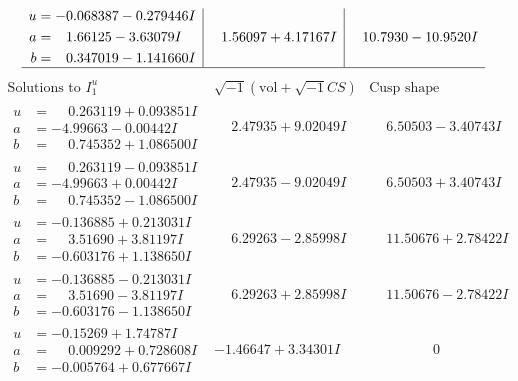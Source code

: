 \documentclass[1p]{elsarticle_modified}
\theoremstyle{definition}
\newcommand{\I}{\sqrt{-1}}
\begin{document}
$$\begin{array}{c|c|c}
\begin{aligned}
u &= -0.068387 - 0.279446 I \\
a &= \phantom{-}1.66125 - 3.63079 I \\
b &= \phantom{-}0.347019 - 1.141660 I\end{aligned}
 & \phantom{-}1.56097 + 4.17167 I & \phantom{-}10.7930 - 10.9520 I\\
 \hline 
 \end{array}$$\newpage$$\begin{array}{c|c|c}  
\text{Solutions to }I^u_{1}& \I (\text{vol} + \sqrt{-1}CS) & \text{Cusp shape}\\
 \hline 
\begin{aligned}
u &= \phantom{-}0.263119 + 0.093851 I \\
a &= -4.99663 - 0.00442 I \\
b &= \phantom{-}0.745352 + 1.086500 I\end{aligned}
 & \phantom{-}2.47935 + 9.02049 I & \phantom{-}6.50503 - 3.40743 I \\ \hline\begin{aligned}
u &= \phantom{-}0.263119 - 0.093851 I \\
a &= -4.99663 + 0.00442 I \\
b &= \phantom{-}0.745352 - 1.086500 I\end{aligned}
 & \phantom{-}2.47935 - 9.02049 I & \phantom{-}6.50503 + 3.40743 I \\ \hline\begin{aligned}
u &= -0.136885 + 0.213031 I \\
a &= \phantom{-}3.51690 + 3.81197 I \\
b &= -0.603176 + 1.138650 I\end{aligned}
 & \phantom{-}6.29263 - 2.85998 I & \phantom{-}11.50676 + 2.78422 I \\ \hline\begin{aligned}
u &= -0.136885 - 0.213031 I \\
a &= \phantom{-}3.51690 - 3.81197 I \\
b &= -0.603176 - 1.138650 I\end{aligned}
 & \phantom{-}6.29263 + 2.85998 I & \phantom{-}11.50676 - 2.78422 I \\ \hline\begin{aligned}
u &= -0.15269 + 1.74787 I \\
a &= \phantom{-}0.009292 + 0.728608 I \\
b &= -0.005764 + 0.677667 I\end{aligned}
 & -1.46647 + 3.34301 I & \phantom{-0.000000 } 0 \\ \hline\begin{aligned}

\end{aligned}
\end{array}$$
\end{document}
